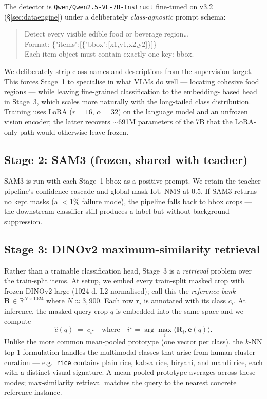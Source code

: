 The detector is \texttt{Qwen/Qwen2.5-VL-7B-Instruct} fine-tuned on v3.2 (\S\ref{sec:dataengine})
under a deliberately \emph{class-agnostic} prompt schema:

\begin{quote}\footnotesize\ttfamily
Detect every visible edible food or beverage region\ldots\\
Format: \{"items":[\{"bbox":[x1,y1,x2,y2]\}]\}\\
Each item object must contain exactly one key: bbox.
\end{quote}

We deliberately strip class names and descriptions from the supervision target.
This forces Stage~1 to specialise in what VLMs do well --- locating cohesive
food regions --- while leaving fine-grained classification to the embedding-
based head in Stage~3, which scales more naturally with the long-tailed
class distribution. Training uses LoRA ($r=16$, $\alpha=32$) on the language
model and an unfrozen vision encoder; the latter recovers $\sim$691M parameters
of the 7B that the LoRA-only path would otherwise leave frozen.

\subsection{Stage 2: SAM3 (frozen, shared with teacher)}
\label{sec:st:s2}

SAM3 is run with each Stage~1 bbox as a positive prompt. We retain the
teacher pipeline's confidence cascade and global mask-IoU NMS at $0.5$. If
SAM3 returns no kept masks (a $<\!1\%$ failure mode), the pipeline falls back
to bbox crops --- the downstream classifier still produces a label but
without background suppression.

\subsection{Stage 3: DINOv2 maximum-similarity retrieval}
\label{sec:st:s3}

Rather than a trainable classification head, Stage~3 is a \emph{retrieval}
problem over the train-split items. At setup, we embed every train-split
masked crop with frozen DINOv2-large (1024-d, L2-normalised); call this the
\emph{reference bank} $\mathbf{R} \in \mathbb{R}^{N \times 1024}$ where
$N \approx 3{,}900$. Each row $\mathbf{r}_i$ is annotated with its class
$c_i$. At inference, the masked query crop $q$ is embedded into the same
space and we compute
\[
\hat{c}(q) \;=\; c_{i^\star} \quad\text{where}\quad i^\star = \arg\max_{i} \langle \mathbf{R}_i, \mathbf{e}(q) \rangle.
\]
Unlike the more common mean-pooled prototype (one vector per class), the
$k$-NN top-1 formulation handles the multimodal classes that arise from
human cluster curation --- e.g.\ \texttt{rice} contains plain rice, kabsa
rice, biryani, and mandi rice, each with a distinct visual signature. A
mean-pooled prototype averages across these modes; max-similarity retrieval
matches the query to the nearest concrete reference instance.

